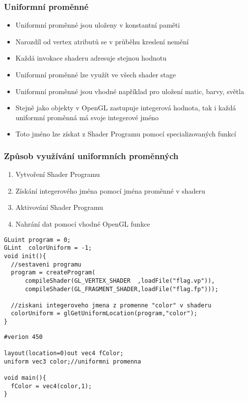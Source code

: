 
\begin{frame}[fragile]
\frametitle{Uniformní proměnné}
  \begin{itemize}
  \item Uniformní proměnné jsou uloženy v konstantní paměti
  \item Narozdíl od vertex atributů se v průběhu kreslení nemění
  \item Každá invokace shaderu adresuje stejnou hodnotu
  \item Uniformní proměnné lze využít ve všech shader stage
  \item Uniformní proměnné jsou vhodné například pro uložení matic, barvy, světla
  \item Stejně jako objekty v OpenGL zastupuje integerová hodnota, tak i každá uniformní proměnná má svoje integerové jméno
  \item Toto jméno lze získat z Shader Programu pomocí specializovaných funkcí
  \end{itemize}
\end{frame}

\begin{frame}[fragile]
\frametitle{Způsob využívání uniformních proměnných}
  \begin{enumerate}
  \item Vytvoření Shader Programu
  \item Získání integerového jména pomocí jména proměnné v shaderu
  \item Aktivování Shader Programu
  \item Nahrání dat pomocí vhodné OpenGL funkce
  \end{enumerate}
{\scriptsize
\begin{verbatim}
GLuint program = 0;
GLint  colorUniform = -1;
void init(){
  //sestaveni programu
  program = createProgram(
      compileShader(GL_VERTEX_SHADER  ,loadFile("flag.vp")),
      compileShader(GL_FRAGMENT_SHADER,loadFile("flag.fp")));

  //ziskani integeroveho jmena z promenne "color" v shaderu
  colorUniform = glGetUniformLocation(program,"color");
}
\end{verbatim}
}

{\scriptsize
\begin{verbatim}
#verion 450

layout(location=0)out vec4 fColor;
uniform vec3 color;//uniformni promenna

void main(){
  fColor = vec4(color,1);
}
\end{verbatim}
}
\end{frame}


